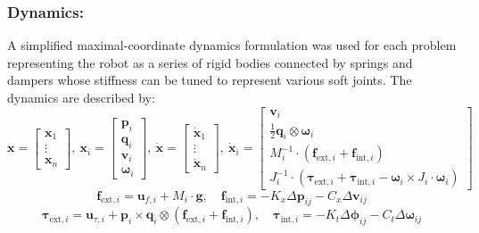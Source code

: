 \subsubsection{Dynamics:} A simplified maximal-coordinate dynamics formulation was used for each problem representing the robot as a series of rigid bodies connected by springs and dampers whose stiffness can be tuned to represent various soft joints. The dynamics are described by:
\begin{equation}
\textbf{x} = \begin{bmatrix}
    \textbf{x}_1 \\
    \vdots \\
    \textbf{x}_n
\end{bmatrix}, \ \textbf{x}_i = \begin{bmatrix}
    \textbf{p}_i \\ \textbf{q}_i \\ \textbf{v}_i \\ \boldsymbol{\omega}_i
\end{bmatrix}, \ \dot{\textbf{x}} = \begin{bmatrix}
    \dot{\textbf{x}}_1 \\ 
    \vdots \\ 
    \dot{\textbf{x}}_n
\end{bmatrix}, \ \dot{\textbf{x}}_i = \begin{bmatrix}
    {\textbf{v}}_i \\ \frac{1}{2}\textbf{q}_i \otimes \boldsymbol{\omega}_i \\ M_i^{-1} \cdot (\textbf{f}_{\text{ext}, i} + \textbf{f}_{\text{int}, i}) \\ J_i^{-1} \cdot (\boldsymbol{\tau}_{\text{ext}, i} + \boldsymbol{\tau}_{\text{int}, i} - \boldsymbol{\omega}_i \times J_i \cdot \boldsymbol{\omega}_i)
\end{bmatrix}  
\label{eq:space_struct1}
\end{equation}
\begin{equation}
     \textbf{f}_{\text{ext}, i} = \textbf{u}_{f,i} + M_i \cdot \textbf{g}, \quad \textbf{f}_{\text{int}, i} = -K_x \Delta \textbf{p}_{ij} - C_x \Delta \textbf{v}_{ij}
     \label{eq:space_struct2}
\end{equation}
\begin{equation}
    \boldsymbol{\tau}_{\text{ext}, i} = \textbf{u}_{\tau,i} + \textbf{p}_i \times \textbf{q}_i \otimes (\textbf{f}_{\text{ext}, i} + \textbf{f}_{\text{int}, i}), \quad \boldsymbol{\tau}_{\text{int}, i} = -K_t \Delta \boldsymbol{\phi}_{ij} - C_t \Delta \boldsymbol{\omega}_{ij} 
    \label{eq:space_struct3}
\end{equation}
